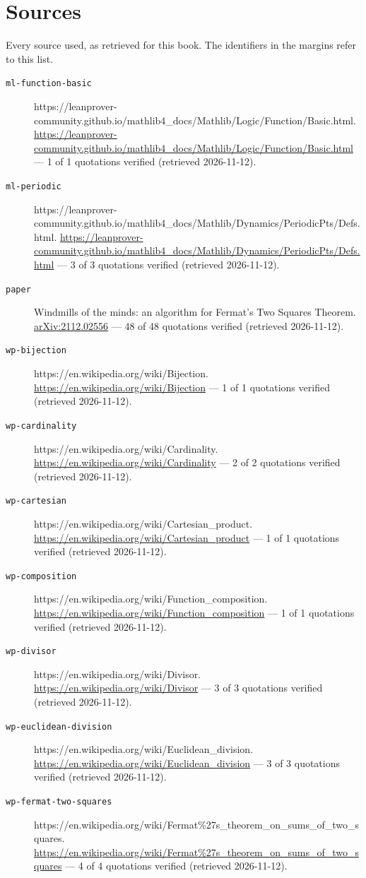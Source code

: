 \documentclass[11pt,letterpaper,openright]{book}
\theoremstyle{plain}
\theoremstyle{definition}
\theoremstyle{remark}
\begin{document}
\chapter{Sources}
Every source used, as retrieved for this book. The identifiers in the margins refer to this list.
\begin{description}\item[\texttt{ml-function-basic}] https://leanprover-community.github.io/mathlib4\_docs/Mathlib/Logic/Function/Basic.html. \url{https://leanprover-community.github.io/mathlib4_docs/Mathlib/Logic/Function/Basic.html} --- 1 of 1 quotations verified (retrieved 2026-11-12).
\item[\texttt{ml-periodic}] https://leanprover-community.github.io/mathlib4\_docs/Mathlib/Dynamics/PeriodicPts/Defs.html. \url{https://leanprover-community.github.io/mathlib4_docs/Mathlib/Dynamics/PeriodicPts/Defs.html} --- 3 of 3 quotations verified (retrieved 2026-11-12).
\item[\texttt{paper}] Windmills of the minds: an algorithm for Fermat's Two Squares Theorem. \url{arXiv:2112.02556} --- 48 of 48 quotations verified (retrieved 2026-11-12).
\item[\texttt{wp-bijection}] https://en.wikipedia.org/wiki/Bijection. \url{https://en.wikipedia.org/wiki/Bijection} --- 1 of 1 quotations verified (retrieved 2026-11-12).
\item[\texttt{wp-cardinality}] https://en.wikipedia.org/wiki/Cardinality. \url{https://en.wikipedia.org/wiki/Cardinality} --- 2 of 2 quotations verified (retrieved 2026-11-12).
\item[\texttt{wp-cartesian}] https://en.wikipedia.org/wiki/Cartesian\_product. \url{https://en.wikipedia.org/wiki/Cartesian_product} --- 1 of 1 quotations verified (retrieved 2026-11-12).
\item[\texttt{wp-composition}] https://en.wikipedia.org/wiki/Function\_composition. \url{https://en.wikipedia.org/wiki/Function_composition} --- 1 of 1 quotations verified (retrieved 2026-11-12).
\item[\texttt{wp-divisor}] https://en.wikipedia.org/wiki/Divisor. \url{https://en.wikipedia.org/wiki/Divisor} --- 3 of 3 quotations verified (retrieved 2026-11-12).
\item[\texttt{wp-euclidean-division}] https://en.wikipedia.org/wiki/Euclidean\_division. \url{https://en.wikipedia.org/wiki/Euclidean_division} --- 3 of 3 quotations verified (retrieved 2026-11-12).
\item[\texttt{wp-fermat-two-squares}] https://en.wikipedia.org/wiki/Fermat\%27s\_theorem\_on\_sums\_of\_two\_squares. \url{https://en.wikipedia.org/wiki/Fermat%27s_theorem_on_sums_of_two_squares} --- 4 of 4 quotations verified (retrieved 2026-11-12).

\end{description}
\end{document}

